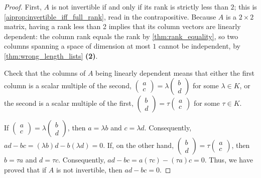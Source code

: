 \begin{proof}
  First, $A$ is not invertible if and only if its rank is strictly less than $2$; this is \cref{aiprop:invertible_iff_full_rank}, read in the contrapositive. Because $A$ is a $2 \times 2$ matrix, having a rank less than 2 implies that its column vectors are linearly dependent: the column rank equals the rank by \cref{thm:rank_equality}, so two columns spanning a space of dimension at most $1$ cannot be independent, by \cref{thm:wrong_length_lists} \textbf{(2)}.

  \begin{exercise}\label{exc:lin_dep_2x2}
    Check that the columns of $A$ being linearly dependent means that either the first column is a scalar multiple of the second, $\left(\begin{smallmatrix} a \\ c \end{smallmatrix}\right) = \lambda \left(\begin{smallmatrix} b \\ d \end{smallmatrix}\right)$ for some $\lambda \in K$, or the second is a scalar multiple of the first, $\left(\begin{smallmatrix} b \\ d \end{smallmatrix}\right) = \tau \left(\begin{smallmatrix} a \\ c \end{smallmatrix}\right)$ for some $\tau \in K$.
\end{exercise}


  If $\left(\begin{smallmatrix} a \\ c \end{smallmatrix}\right) = \lambda \left(\begin{smallmatrix} b \\ d \end{smallmatrix}\right)$, then $a = \lambda b$ and $c = \lambda d$. Consequently, $ad - bc = (\lambda b)d - b(\lambda d) = 0$.
  If, on the other hand, $\left(\begin{smallmatrix} b \\ d \end{smallmatrix}\right) = \tau \left(\begin{smallmatrix} a \\ c \end{smallmatrix}\right)$, then $b = \tau a$ and $d = \tau c$. Consequently, $ad - bc = a(\tau c) - (\tau a)c = 0$.
  Thus, we have proved that if $A$ is not invertible, then $ad - bc = 0$.


\end{proof}
